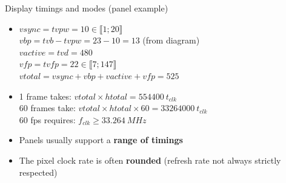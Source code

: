 \begin{frame}{Display timings and modes (panel example)}
\begin{minipage}[b]{0.6\textwidth}
\begin{itemize}
    \item \(vsync = tvpw = 10 \in \llbracket 1;20 \rrbracket\)\\
    \(vbp = tvb - tvpw = 23 - 10 = 13\) (from diagram)\\
    \(vactive = tvd = 480\)\\
    \(vfp = tvfp = 22 \in \llbracket 7;147 \rrbracket\)\\
    \(vtotal = vsync + vbp + vactive + vfp = 525\)
    \item 1 frame takes: \(vtotal \times htotal = 554400~t_{clk}\)\\
    60 frames take: \(vtotal \times htotal \times 60 = 33264000~t_{clk}\)\\
    60 fps requires: \(f_{clk} \geq 33.264~MHz\)
    \end{itemize}
  \end{minipage}
  \vspace{0.5em}

  \begin{itemize}
  \item Panels usually support a \textbf{range of timings}
  \item The pixel clock rate is often \textbf{rounded} (refresh rate not always strictly respected)
  \end{itemize}

\end{frame}


